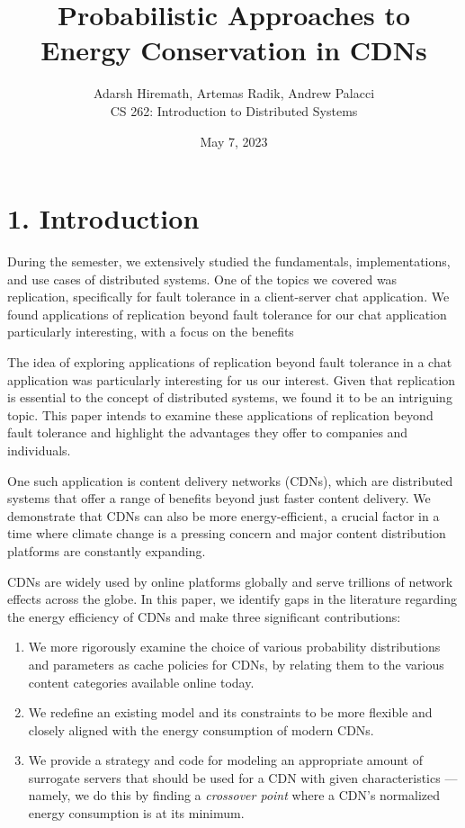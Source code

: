 \documentclass[
	a4paper, %
	10pt, %
	unnumberedsections, %
	twoside, %
]{LTJournalArticle}
\title{Probabilistic Approaches to 
\\ Energy Conservation in CDNs} %
\author{%
	Adarsh Hiremath, Artemas Radik, Andrew Palacci \\
	CS 262: Introduction to Distributed Systems \\
}
\date{May 7, 2023}
\begin{document}
\maketitle %


\section{1. Introduction}

During the semester, we extensively studied the fundamentals, implementations, and use cases of distributed systems. One of the topics we covered was replication, specifically for fault tolerance in a client-server chat application. We found applications of replication beyond fault tolerance for our chat application particularly interesting, with a focus on the benefits 


The idea of exploring applications of replication beyond fault tolerance in a chat application was particularly interesting for us our interest. Given that replication is essential to the concept of distributed systems, we found it to be an intriguing topic. This paper intends to examine these applications of replication beyond fault tolerance and highlight the advantages they offer to companies and individuals.

One such application is content delivery networks (CDNs), which are distributed systems that offer a range of benefits beyond just faster content delivery. We demonstrate that CDNs can also be more energy-efficient, a crucial factor in a time where climate change is a pressing concern and major content distribution platforms are constantly expanding.

CDNs are widely used by online platforms globally and serve trillions of network effects across the globe. In this paper, we identify gaps in the literature regarding the energy efficiency of CDNs and make three significant contributions: 
\begin{enumerate}
    \item We more rigorously examine the choice of various probability distributions and parameters as cache policies for CDNs, by relating them to the various content categories available online today.
    \item We redefine an existing model and its constraints to be more flexible and closely aligned with the energy consumption of modern CDNs.
    \item We provide a strategy and code for modeling an appropriate amount of surrogate servers that should be used for a CDN with given characteristics --- namely, we do this by finding a \textit{crossover point} where a CDN's normalized energy consumption is at its minimum.
\end{enumerate}
\end{document}

